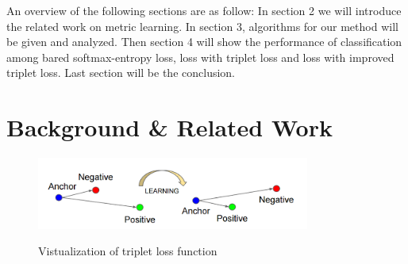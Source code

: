 \documentclass[11pt,onecolumn,letterpaper]{article}
\begin{document}
An overview of the following sections are as follow: In section 2 we will introduce the related work on metric learning. In section 3, algorithms for our method will be given and analyzed. Then section 4 will show the performance of classification among bared softmax-entropy loss, loss with triplet loss and loss with improved triplet loss. Last section will be the conclusion.


\section{Background \& Related Work}

\begin{figure}[t]
\centering
\includegraphics[width = 0.8\textwidth]{triplet.png}
\label{triplet}
\caption{Vistualization of triplet loss function}
\end{figure}
\end{document}
